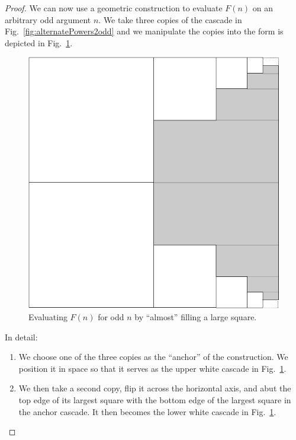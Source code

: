 \begin{proof}
We can now use a geometric construction to evaluate $F(n)$ on an
arbitrary odd argument $n$.  We take three copies of the cascade in
Fig.~\ref{fig:alternatePowers2odd} and we manipulate the copies into
the form is depicted in Fig.~\ref{fig:alternatePowers2finalOdd}.  
\begin{figure} [htb]
\begin{center}
        \includegraphics[scale=0.3]{FiguresMaths/alternatePowers2odd.png}
\caption{Evaluating $F(n)$ for odd $n$ by ``almost'' filling a large square.}
        \label{fig:alternatePowers2finalOdd}
\end{center}
\end{figure}
In detail:
\begin{enumerate}
\item
We choose one of the three copies as the ``anchor'' of the
construction.  We position it in space so that it serves as the upper
white cascade in Fig.~\ref{fig:alternatePowers2finalOdd}.
\item
We then take a second copy, flip it across the horizontal axis, and
abut the top edge of its largest square with the bottom edge of the
largest square in the anchor cascade.  It then becomes the lower white
cascade in Fig.~\ref{fig:alternatePowers2finalOdd}.


\end{enumerate}
\end{proof}
